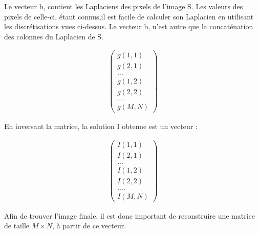 Le vecteur b, contient les Laplaciens des pixels de l'image S.
Les valeurs des pixels de celle-ci, étant connus,il est facile de calculer son Laplacien en utilisant les discrétisations vues ci-dessus. Le vecteur b, n'est autre que la concaténation des colonnes du Laplacien de S.
\begin{center}
\begin{equation}
\left.
\begin{aligned}
\begin{pmatrix}
g(1,1)\\
g(2,1)\\
...\\
g(1,2)\\
g(2,2)\\
....\\
g(M, N)
\end{pmatrix}
\end{aligned}
\right.
\end{equation}
\end{center}
En inversant la matrice, la solution I obtenue est un vecteur : 
\begin{center}
\begin{equation}
\left.
\begin{aligned}
\begin{pmatrix}
I(1,1)\\
I(2,1)\\
...\\
I(1,2)\\
I(2,2)\\
....\\
I(M, N)
\end{pmatrix}
\end{aligned}
\right.
\end{equation}
\end{center}
Afin de trouver l'image finale, il est donc important de reconstruire une matrice de taille $M\times N$, à partir de ce vecteur. 

